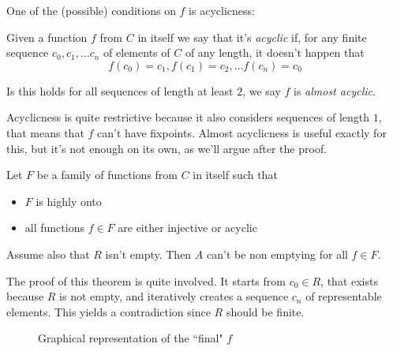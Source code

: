 One of the (possible) conditions on $f$ is acyclicness:
\begin{definition}
	Given a function $f$ from $C$ in itself we say that it's \textit{acyclic} if, for any finite sequence $c_0, c_1, \dots c_n$ of elements of $C$ of any length, it doesn't happen that
	\[
	f(c_0) = c_1, f(c_1) = c_2, \dots f(c_n) = c_0
	\]
	
	Is this holds for all sequences of length at least $2$, we say $f$ is \textit{almost acyclic}.
\end{definition}
Acyclicness is quite restrictive because it also considers sequences of length $1$, that means that $f$ can't have fixpoints. Almost acyclicness is useful exactly for this, but it's not enough on its own, as we'll argue after the proof.

\begin{theorem}\label{ch4:th:non-empt-res-local}
	Let $F$ be a family of functions from $C$ in itself such that
	\begin{itemize}
		\item $F$ is highly onto
		\item all functions $f \in F$ are either injective or acyclic
	\end{itemize}
	Assume also that $R$ isn't empty. Then $A$ can't be non emptying for all $f \in F$.
\end{theorem}
The proof of this theorem is quite involved. It starts from $c_0 \in R$, that exists because $R$ is not empty, and iteratively creates a sequence $c_n$ of representable elements. This yields a contradiction since $R$ should be finite.

\begin{figure*}[ht]
	\centering
	\caption{Graphical representation of the ``final" $f$}
	\label{ch4:fig:final-f-sketch}
\end{figure*}

